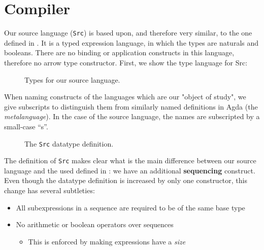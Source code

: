 \documentclass[a4paper]{article}
\begin{document}
    \section{Compiler}
    \label{sec:basic}

        Our source language (\texttt{Src}) is based upon, and therefore very similar, to the one
        defined in \cite{typed-stack-safe-compiler}. It is a typed expression language, in which
        the types are naturals and booleans. There are no binding or application constructs
        in this language, therefore no arrow type constructor. First, we show the type language for
        Src:

        \begin{figure}[h!]
            \caption{Types for our source language.
                \label{lst:tys}
            }
        \end{figure}

        When naming constructs of the languages which are our "object of study", we give
        subscripts to distinguish them from similarly named definitions in Agda (the \emph{metalanguage}).
        In the case of the source language, the names are subscripted by a small-case ``s''.

        \begin{figure}[h!]
            \caption{
                The \texttt{Src} datatype definition.
                \label{lst:src}
            }
        \end{figure}

        The definition of \texttt{Src} makes clear what is the main difference between our source language
        and the used defined in \cite{typed-stack-safe-compiler}: we have an additional \textbf{sequencing}
        construct. Even though the datatype definition is increased by only one constructor,
        this change has several subtleties:

        \begin{itemize}
            \item All subexpressions in a sequence are required to be of the same base type
            \item No arithmetic or boolean operators over sequences
                \begin{itemize}
                    \item This is enforced by making expressions have a \emph{size}
                \end{itemize}
        \end{itemize}
\end{document}
